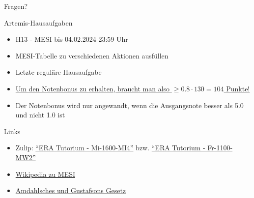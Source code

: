 \begin{frame}[c]{}{}
	\begin{center}
		\LARGE Fragen?
	\end{center}
\end{frame}

\begin{frame}[c, fragile]{Artemis-Hausaufgaben}{}
	\begin{itemize}
		\item H13 - MESI bis 04.02.2024 23:59 Uhr
		\item MESI-Tabelle zu verschiedenen Aktionen ausfüllen
		\item Letzte reguläre Hausaufgabe
		\item \underline{Um den Notenbonus zu erhalten, braucht man also $\ge 0.8\cdot 130 = 104$ Punkte!}
		\item Der Notenbonus wird nur angewandt, wenn die Ausgangsnote besser als 5.0 und nicht 1.0 ist
	\end{itemize}
\end{frame}

\begin{frame}[fragile, c]{Links}{}
	\begin{itemize}
		\item Zulip: \href{https://zulip.in.tum.de/#narrow/stream/1917-ERA-Tutorium---Mi-1600-MI4}{\enquote{ERA Tutorium - Mi-1600-MI4}}
		      bzw. \href{https://zulip.in.tum.de/#narrow/stream/1940-ERA-Tutorium---Fr-1100-MW2}{\enquote{ERA Tutorium - Fr-1100-MW2}}
		\item \href{https://de.wikipedia.org/wiki/MESI}{Wikipedia zu MESI}
		\item \href{https://www.educative.io/answers/difference-between-amdahls-and-gustafsons-laws}{Amdahlsches und Gustafsons Gesetz}
	\end{itemize}
\end{frame}

\maketitle


